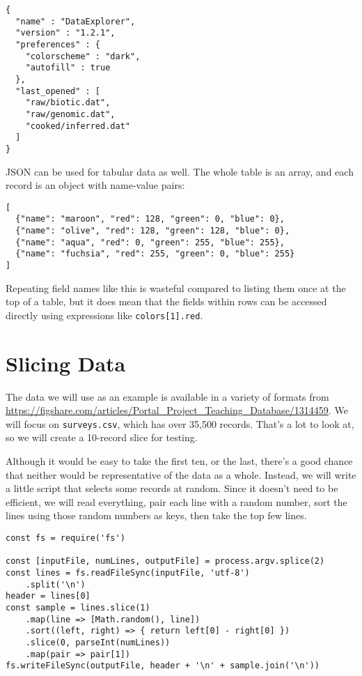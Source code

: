\begin{verbatim}
{
  "name" : "DataExplorer",
  "version" : "1.2.1",
  "preferences" : {
    "colorscheme" : "dark",
    "autofill" : true
  },
  "last_opened" : [
    "raw/biotic.dat",
    "raw/genomic.dat",
    "cooked/inferred.dat"
  ]
}
\end{verbatim}

JSON can be used for tabular data as well.
The whole table is an array,
and each record is an object with name-value pairs:

\begin{verbatim}
[
  {"name": "maroon", "red": 128, "green": 0, "blue": 0},
  {"name": "olive", "red": 128, "green": 128, "blue": 0},
  {"name": "aqua", "red": 0, "green": 255, "blue": 255},
  {"name": "fuchsia", "red": 255, "green": 0, "blue": 255}
]
\end{verbatim}

\noindent
Repeating field names like this is wasteful compared to listing them once at the top of a table,
but it does mean that the fields within rows can be accessed directly
using expressions like \texttt{colors[1].red}.

\section{Slicing Data}\label{s:dataman-slicing}

The data we will use as an example is available in a variety of formats
from \url{https://figshare.com/articles/Portal_Project_Teaching_Database/1314459}.
We will focus on \texttt{surveys.csv},
which has over 35,500 records.
That's a lot to look at,
so we will create a 10-record slice for testing.

Although it would be easy to take the first ten,
or the last,
there's a good chance that neither would be representative of the data as a whole.
Instead,
we will write a little script that selects some records at random.
Since it doesn't need to be efficient,
we will read everything,
pair each line with a random number,
sort the lines using those random numbers as keys,
then take the top few lines.

\begin{verbatim}
const fs = require('fs')

const [inputFile, numLines, outputFile] = process.argv.splice(2)
const lines = fs.readFileSync(inputFile, 'utf-8')
    .split('\n')
header = lines[0]
const sample = lines.slice(1)
    .map(line => [Math.random(), line])
    .sort((left, right) => { return left[0] - right[0] })
    .slice(0, parseInt(numLines))
    .map(pair => pair[1])
fs.writeFileSync(outputFile, header + '\n' + sample.join('\n'))
\end{verbatim}

